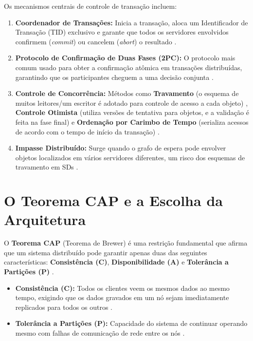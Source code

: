 \documentclass[a4paper,12pt]{article}
\begin{document}
Os mecanismos centrais de controle de transação incluem:

\begin{enumerate}
    \item \textbf{Coordenador de Transações:} Inicia a transação, aloca um Identificador de Transação (TID) exclusivo e garante que todos os servidores envolvidos confirmem (\textit{commit}) ou cancelem (\textit{abort}) o resultado \cite{377, 408, 406}.
    \item \textbf{Protocolo de Confirmação de Duas Fases (2PC):} O protocolo mais comum usado para obter a confirmação atômica em transações distribuídas, garantindo que os participantes cheguem a uma decisão conjunta \cite{405, 407}.
    \item \textbf{Controle de Concorrência:} Métodos como \textbf{Travamento} (o esquema de muitos leitores/um escritor é adotado para controle de acesso a cada objeto) \cite{380, 549}, \textbf{Controle Otimista} (utiliza versões de tentativa para objetos, e a validação é feita na fase final) \cite{381, 554} e \textbf{Ordenação por Carimbo de Tempo} (serializa acessos de acordo com o tempo de início da transação) \cite{394, 400}.
    \item \textbf{Impasse Distribuído:} Surge quando o grafo de espera pode envolver objetos localizados em vários servidores diferentes, um risco dos esquemas de travamento em SDs \cite{389, 413}.
\end{enumerate}

\section{O Teorema CAP e a Escolha da Arquitetura}
O \textbf{Teorema CAP} (Teorema de Brewer) é uma restrição fundamental que afirma que um sistema distribuído pode garantir apenas duas das seguintes características: \textbf{Consistência (C)}, \textbf{Disponibilidade (A)} e \textbf{Tolerância a Partições (P)} \cite{61}.

\begin{itemize}
    \item \textbf{Consistência (C):} Todos os clientes veem os mesmos dados ao mesmo tempo, exigindo que os dados gravados em um nó sejam imediatamente replicados para todos os outros \cite{62}.
    \item \textbf{Tolerância a Partições (P):} Capacidade do sistema de continuar operando mesmo com falhas de comunicação de rede entre os nós \cite{61}.
\end{itemize}
\end{document}
